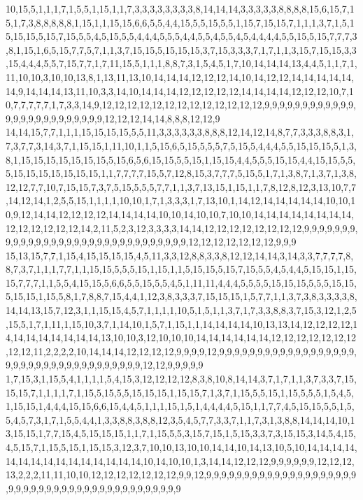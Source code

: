 10,15,5,1,1,1,7,1,5,5,1,15,1,1,7,3,3,3,3,3,3,3,3,8,14,14,14,3,3,3,3,3,8,8,8,8,15,6,15,7,15,1,7,3,8,8,8,8,8,1,15,1,1,15,15,6,6,5,5,4,4,15,5,5,15,5,5,1,15,7,15,15,7,1,1,1,3,7,1,5,15,15,15,5,15,7,15,5,5,4,5,15,5,5,4,4,4,5,5,5,4,4,5,5,4,5,5,4,5,4,4,4,4,5,5,15,5,15,7,7,7,3,8,1,15,1,6,5,15,7,7,5,7,1,1,3,7,15,15,5,15,15,15,3,7,15,3,3,3,7,1,7,1,1,3,15,7,15,15,3,3,15,4,4,4,5,5,7,15,7,7,1,7,11,15,5,1,1,1,8,8,7,3,1,5,4,5,1,7,10,14,14,14,13,4,4,5,1,1,7,1,11,10,10,3,10,10,13,8,1,13,11,13,10,14,14,14,12,12,12,14,10,14,12,12,14,14,14,14,14,14,9,14,14,14,13,11,10,3,3,14,10,14,14,14,12,12,12,12,12,14,14,14,14,12,12,12,10,7,10,7,7,7,7,7,1,7,3,3,14,9,12,12,12,12,12,12,12,12,12,12,12,12,12,9,9,9,9,9,9,9,9,9,9,9,9,9,9,9,9,9,9,9,9,9,9,9,9,9,12,12,12,14,14,8,8,8,12,12,9
14,14,15,7,7,1,1,1,15,15,15,15,5,5,11,3,3,3,3,3,3,8,8,8,12,14,12,14,8,7,7,3,3,3,8,8,3,1,7,3,7,7,3,14,3,7,1,15,15,1,11,10,1,1,5,15,6,5,15,5,5,5,7,5,15,5,4,4,4,5,5,15,15,15,5,1,3,8,1,15,15,15,15,15,15,15,5,15,6,5,6,15,15,5,5,15,1,15,15,4,4,5,5,5,15,15,4,4,15,15,5,5,5,15,15,15,15,15,15,15,1,1,7,7,7,7,15,5,7,12,8,15,3,7,7,7,5,15,5,1,7,1,3,8,7,1,3,7,1,3,8,12,12,7,7,10,7,15,15,7,3,7,5,15,5,5,5,7,7,1,1,3,7,13,15,1,15,1,1,7,8,12,8,12,3,13,10,7,7,14,12,14,1,2,5,5,15,1,1,1,1,10,10,1,7,1,3,3,3,1,7,13,10,1,14,12,14,14,14,14,14,10,10,10,9,12,14,14,12,12,12,12,14,14,14,14,10,10,14,10,10,7,10,10,14,14,14,14,14,14,14,14,12,12,12,12,12,12,14,2,11,5,2,3,12,3,3,3,3,14,14,12,12,12,12,12,12,12,12,9,9,9,9,9,9,9,9,9,9,9,9,9,9,9,9,9,9,9,9,9,9,9,9,9,9,9,9,9,9,9,12,12,12,12,12,12,12,9,9,9
15,13,15,7,7,1,15,4,15,15,15,15,4,5,11,3,3,12,8,8,3,3,8,12,12,14,14,3,14,3,3,7,7,7,7,8,8,7,3,7,1,1,1,7,7,1,1,15,15,5,5,5,15,1,15,1,1,5,15,15,5,15,7,15,5,5,4,5,4,4,5,15,15,1,15,15,7,7,7,1,1,5,5,4,15,15,5,6,6,5,5,15,5,5,4,5,1,11,11,4,4,4,5,5,5,5,15,15,15,5,5,5,15,15,5,15,15,1,15,5,8,1,7,8,8,7,15,4,4,1,12,3,8,3,3,3,7,15,15,15,1,5,7,7,1,1,3,7,3,8,3,3,3,3,8,14,14,13,15,7,12,3,1,1,15,15,4,5,7,1,1,1,1,10,5,1,5,1,1,3,7,1,7,3,3,8,8,3,7,15,3,12,1,2,5,15,5,1,7,1,11,1,15,10,3,7,1,14,10,1,5,7,1,15,1,1,14,14,14,14,10,13,13,14,12,12,12,12,14,14,14,14,14,14,14,14,13,10,10,3,12,10,10,10,14,14,14,14,14,14,12,12,12,12,12,12,12,12,12,11,2,2,2,2,10,14,14,14,12,12,12,12,9,9,9,9,12,9,9,9,9,9,9,9,9,9,9,9,9,9,9,9,9,9,9,9,9,9,9,9,9,9,9,9,9,9,9,9,9,9,9,9,9,12,12,9,9,9,9,9
1,7,15,3,1,15,5,4,1,1,1,1,5,4,15,3,12,12,12,12,8,3,8,10,8,14,14,3,7,1,7,1,1,3,7,3,3,7,15,15,15,7,1,1,1,1,7,1,15,5,15,5,5,15,15,15,1,15,15,7,1,3,7,1,15,5,5,15,1,15,5,5,5,1,5,4,5,1,15,15,1,4,4,4,15,15,6,6,15,4,4,5,1,1,1,15,1,5,1,4,4,4,4,5,15,1,1,7,7,4,5,15,15,5,5,1,5,5,4,5,7,3,1,7,1,5,5,4,4,1,3,3,8,8,3,8,8,12,3,5,4,5,7,7,3,3,7,1,1,7,3,1,3,8,8,14,14,14,10,13,15,15,1,7,7,15,4,5,15,15,15,1,1,7,1,15,5,5,3,15,7,15,1,5,15,3,3,7,3,15,15,3,14,5,4,15,4,5,15,7,1,15,5,15,1,15,15,3,12,3,7,10,10,13,10,10,14,14,10,14,13,10,5,10,14,14,14,14,14,14,14,14,14,14,14,14,14,14,14,10,14,10,10,1,3,14,14,12,12,12,9,9,9,9,9,9,12,12,12,13,2,2,2,11,11,10,10,12,12,12,12,12,12,12,9,9,12,9,9,9,9,9,9,9,9,9,9,9,9,9,9,9,9,9,9,9,9,9,9,9,9,9,9,9,9,9,9,9,9,9,9,9,9,9,9,9,9,9,9,9
